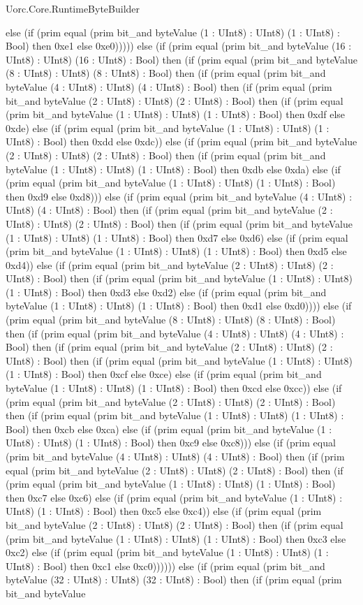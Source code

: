 \begin{lexlean}{Uorc.Core.RuntimeByteBuilder}
\begin{semanticmodule}
{else (if (prim equal (prim bit_and byteValue (1 : UInt8) : UInt8) (1 : UInt8) : Bool) then 0xe1 else 0xe0))))) else (if (prim equal (prim bit_and byteValue (16 : UInt8) : UInt8) (16 : UInt8) : Bool) then (if (prim equal (prim bit_and byteValue (8 : UInt8) : UInt8) (8 : UInt8) : Bool) then (if (prim equal (prim bit_and byteValue (4 : UInt8) : UInt8) (4 : UInt8) : Bool) then (if (prim equal (prim bit_and byteValue (2 : UInt8) : UInt8) (2 : UInt8) : Bool) then (if (prim equal (prim bit_and byteValue (1 : UInt8) : UInt8) (1 : UInt8) : Bool) then 0xdf else 0xde) else (if (prim equal (prim bit_and byteValue (1 : UInt8) : UInt8) (1 : UInt8) : Bool) then 0xdd else 0xdc)) else (if (prim equal (prim bit_and byteValue (2 : UInt8) : UInt8) (2 : UInt8) : Bool) then (if (prim equal (prim bit_and byteValue (1 : UInt8) : UInt8) (1 : UInt8) : Bool) then 0xdb else 0xda) else (if (prim equal (prim bit_and byteValue (1 : UInt8) : UInt8) (1 : UInt8) : Bool) then 0xd9 else 0xd8))) else (if (prim equal (prim bit_and byteValue (4 : UInt8) : UInt8) (4 : UInt8) : Bool) then (if (prim equal (prim bit_and byteValue (2 : UInt8) : UInt8) (2 : UInt8) : Bool) then (if (prim equal (prim bit_and byteValue (1 : UInt8) : UInt8) (1 : UInt8) : Bool) then 0xd7 else 0xd6) else (if (prim equal (prim bit_and byteValue (1 : UInt8) : UInt8) (1 : UInt8) : Bool) then 0xd5 else 0xd4)) else (if (prim equal (prim bit_and byteValue (2 : UInt8) : UInt8) (2 : UInt8) : Bool) then (if (prim equal (prim bit_and byteValue (1 : UInt8) : UInt8) (1 : UInt8) : Bool) then 0xd3 else 0xd2) else (if (prim equal (prim bit_and byteValue (1 : UInt8) : UInt8) (1 : UInt8) : Bool) then 0xd1 else 0xd0)))) else (if (prim equal (prim bit_and byteValue (8 : UInt8) : UInt8) (8 : UInt8) : Bool) then (if (prim equal (prim bit_and byteValue (4 : UInt8) : UInt8) (4 : UInt8) : Bool) then (if (prim equal (prim bit_and byteValue (2 : UInt8) : UInt8) (2 : UInt8) : Bool) then (if (prim equal (prim bit_and byteValue (1 : UInt8) : UInt8) (1 : UInt8) : Bool) then 0xcf else 0xce) else (if (prim equal (prim bit_and byteValue (1 : UInt8) : UInt8) (1 : UInt8) : Bool) then 0xcd else 0xcc)) else (if (prim equal (prim bit_and byteValue (2 : UInt8) : UInt8) (2 : UInt8) : Bool) then (if (prim equal (prim bit_and byteValue (1 : UInt8) : UInt8) (1 : UInt8) : Bool) then 0xcb else 0xca) else (if (prim equal (prim bit_and byteValue (1 : UInt8) : UInt8) (1 : UInt8) : Bool) then 0xc9 else 0xc8))) else (if (prim equal (prim bit_and byteValue (4 : UInt8) : UInt8) (4 : UInt8) : Bool) then (if (prim equal (prim bit_and byteValue (2 : UInt8) : UInt8) (2 : UInt8) : Bool) then (if (prim equal (prim bit_and byteValue (1 : UInt8) : UInt8) (1 : UInt8) : Bool) then 0xc7 else 0xc6) else (if (prim equal (prim bit_and byteValue (1 : UInt8) : UInt8) (1 : UInt8) : Bool) then 0xc5 else 0xc4)) else (if (prim equal (prim bit_and byteValue (2 : UInt8) : UInt8) (2 : UInt8) : Bool) then (if (prim equal (prim bit_and byteValue (1 : UInt8) : UInt8) (1 : UInt8) : Bool) then 0xc3 else 0xc2) else (if (prim equal (prim bit_and byteValue (1 : UInt8) : UInt8) (1 : UInt8) : Bool) then 0xc1 else 0xc0)))))) else (if (prim equal (prim bit_and byteValue (32 : UInt8) : UInt8) (32 : UInt8) : Bool) then (if (prim equal (prim bit_and byteValue }
\end{semanticmodule}
\end{lexlean}
